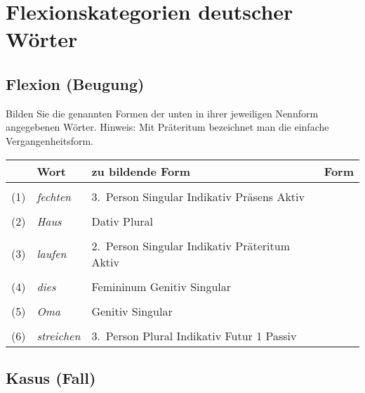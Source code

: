 \documentclass[12pt,a4paper,twoside]{article}
\begin{document}
\newpage

\section{Flexionskategorien deutscher Wörter}

\subsection{ Flexion (Beugung)}

Bilden Sie die genannten Formen der unten in ihrer jeweiligen Nennform angegebenen Wörter.
Hinweis: Mit Präteritum bezeichnet man die einfache Vergangenheitsform.

\begin{center}
  \begin{tabular}[h]{cllp{}}
    \toprule
    & \textbf{Wort} & \textbf{zu bildende Form} & \textbf{Form} \\
    \midrule
    &&& \\
    (1) & \textit{fechten} & 3.~Person Singular Indikativ Präsens Aktiv    & \\\cline{4-4}
    &&& \\
    (2) & \textit{Haus}    & Dativ Plural                                  & \\\cline{4-4}
    &&& \\
    (3) & \textit{laufen}  & 2.~Person Singular Indikativ Präteritum Aktiv & \\\cline{4-4}
    &&& \\
    (4) & \textit{dies}    & Femininum Genitiv Singular                    & \\\cline{4-4}
    &&& \\
    (5) & \textit{Oma}     & Genitiv Singular                              & \\\cline{4-4}
    &&& \\
    (6) & \textit{streichen} & 3.~Person Plural Indikativ Futur 1 Passiv   & \\\cline{4-4}
    \end{tabular}
\end{center}

\subsection{ Kasus (Fall)}
\end{document}
